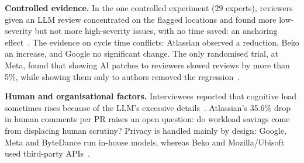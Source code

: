 \textbf{Controlled evidence.}
In the one controlled experiment (29 experts), reviewers given an LLM review concentrated on the flagged locations and found more low-severity but not more high-severity issues, with no time saved: an anchoring effect~\cite{tufano2025deep}.
The evidence on cycle time conflicts: Atlassian observed a reduction, Beko an increase, and Google no significant change.
The only randomised trial, at Meta, found that showing AI patches to reviewers slowed reviews by more than 5\%, while showing them only to authors removed the regression~\cite{maddila2025ai}.

\textbf{Human and organisational factors.}
Interviewees reported that cognitive load sometimes rises because of the LLM's excessive details~\cite{alami2025human}. Atlassian's 35.6\% drop in human comments per PR raises an open question: do workload savings come from displacing human scrutiny? Privacy is handled mainly by design: Google, Meta and ByteDance run in-house models, whereas Beko and Mozilla/Ubisoft used third-party APIs~\cite{sun2025bitsai,cihan2025automated,olewicki2024impact}.

